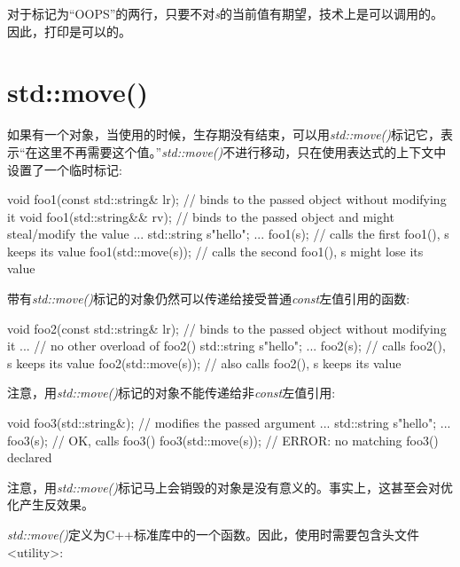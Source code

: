 对于标记为“OOPS”的两行，只要不对\textit{s}的当前值有期望，技术上是可以调用的。因此，打印是可以的。\par


\section{std::move()}

如果有一个对象，当使用的时候，生存期没有结束，可以用\textit{std::move()}标记它，表示“在这里不再需要这个值。”\textit{std::move()}不进行移动，只在使用表达式的上下文中设置了一个临时标记:\par

\begin{codebox}[cpp]
void foo1(const std::string& lr); // binds to the passed object without modifying it
void foo1(std::string&& rv); // binds to the passed object and might steal/modify the value
...
std::string s{"hello"};
...
foo1(s); // calls the first foo1(), s keeps its value
foo1(std::move(s)); // calls the second foo1(), s might lose its value
\end{codebox}

带有\textit{std::move()}标记的对象仍然可以传递给接受普通\textit{const}左值引用的函数:\par

\begin{codebox}[cpp]
void foo2(const std::string& lr); // binds to the passed object without modifying it
... // no other overload of foo2()
std::string s{"hello"};
...
foo2(s); // calls foo2(), s keeps its value
foo2(std::move(s)); // also calls foo2(), s keeps its value
\end{codebox}

注意，用\textit{std::move()}标记的对象不能传递给非\textit{const}左值引用:\par

\begin{codebox}[cpp]
void foo3(std::string&); // modifies the passed argument
...
std::string s{"hello"};
...
foo3(s); // OK, calls foo3()
foo3(std::move(s)); // ERROR: no matching foo3() declared
\end{codebox}

注意，用\textit{std::move()}标记马上会销毁的对象是没有意义的。事实上，这甚至会对优化产生反效果。


\textit{std::move()}定义为C++标准库中的一个函数。因此，使用时需要包含头文件<utility>:\par

